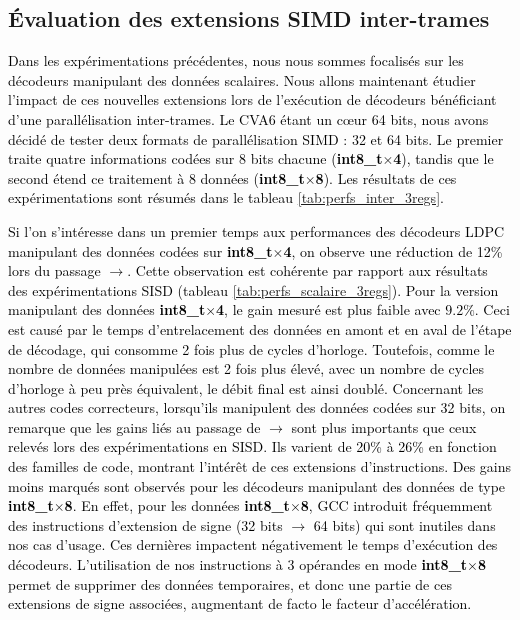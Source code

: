 \documentclass[../main.tex]{subfiles}
\begin{document}
%
%
%
%
%
\subsection{Évaluation des extensions SIMD inter-trames}
%
%
%
%

\textcolor{black}{Dans les expérimentations précédentes, nous nous sommes focalisés sur les décodeurs manipulant des données scalaires. Nous allons maintenant étudier l'impact de ces nouvelles extensions lors de l'exécution de décodeurs bénéficiant d'une parallélisation inter-trames. 
Le CVA6 étant un cœur 64 bits, nous avons décidé de tester deux formats de parallélisation SIMD : 32 et 64 bits. 
Le premier traite quatre informations codées sur 8 bits chacune (\textbf{int8\_t$\times$4}), tandis que le second étend ce traitement à 8 données (\textbf{int8\_t$\times$8}). 
Les résultats de ces expérimentations sont résumés dans le tableau \ref{tab:perfs_inter_3regs}.}



\textcolor{black}{
Si l'on s'intéresse dans un premier temps aux performances des décodeurs LDPC manipulant des données codées sur \textbf{int8\_t$\times$4}, on observe une réduction de 12\% lors du passage  $\rightarrow$.
Cette observation est cohérente par rapport aux résultats des expérimentations SISD (tableau \ref{tab:perfs_scalaire_3regs}).
Pour la version manipulant des données \textbf{int8\_t$\times$4}, le gain mesuré est plus faible avec $9.2\%$.
Ceci est causé par le temps d'entrelacement des données en amont et en aval de l'étape de décodage, qui consomme 2 fois plus de cycles d'horloge.
Toutefois, comme le nombre de données manipulées est 2 fois plus élevé, avec un nombre de cycles d'horloge à peu près équivalent, le débit final est ainsi doublé.
Concernant les autres codes correcteurs, lorsqu'ils manipulent des données codées sur 32 bits, on remarque que les gains liés au passage de $\rightarrow$ sont plus importants que ceux relevés lors des expérimentations en SISD.
Ils varient de 20\% à 26\% en fonction des familles de code, montrant l'intérêt de ces extensions d'instructions.
Des gains moins marqués sont observés pour les décodeurs manipulant des données de type \textbf{int8\_t$\times$8}.
En effet, pour les données \textbf{int8\_t$\times$8}, GCC introduit fréquemment des instructions d'extension de signe (32 bits $\rightarrow$ 64 bits) qui sont inutiles dans nos cas d'usage.
Ces dernières impactent négativement le temps d'exécution des décodeurs.
L'utilisation de nos instructions à 3 opérandes en mode \textbf{int8\_t$\times$8} permet de supprimer des données temporaires, et donc une partie de ces extensions de signe associées, augmentant de facto le facteur d'accélération.}
\end{document}
